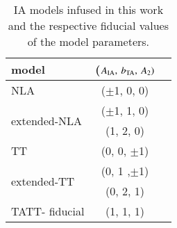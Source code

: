 \begin{table}
   \centering
    \caption{IA models infused in this work and the respective fiducial values of the model parameters.}
   \begin{tabular}{@{} lcr @{}} %
      \hline
      \hline
      model   		& ($A_{\rm IA}, \: b_{\rm TA}, \: A_2)$ \\
      \hline
      NLA     		& ($\pm$1, 0, 0) &  \\
      \hline
      \multirow{2}{*}{extended-NLA }  	&   ($\pm$1, 1, 0)   \\
                                        &  (1, 2, 0)   \\
      \hline
      TT 			&  {(0, 0, $\pm$1)} &  \\
      \hline
      \multirow{2}{*}{extended-TT} 	    &  (0, 1 ,$\pm$1)   \\
                                        &  (0, 2, 1)   \\
      \hline
      TATT- fiducial	&  (1, 1, 1)  \\
      \hline
      \hline
   \end{tabular}
   \label{table:IAmodels}
\end{table}
